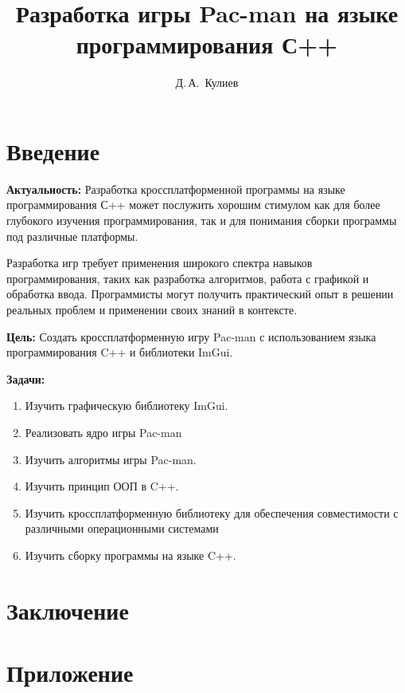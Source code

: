 \documentclass[14pt, oneside]{altsu-report}
\title{Разработка игры Pac-man на языке программирования С++}
\author{Д.\,А.~Кулиев}
\institute{Институт цифровых технологий, электроники и физики}
\date{\the\year}
\begin{document}
\maketitle

\setcounter{page}{2}
\makeabstract
\tableofcontents

\chapter*{Введение}

\textbf{Актуальность:}
Разработка кроссплатформенной программы на языке программирования С++ может послужить хорошим стимулом как для более глубокого изучения программирования, так и для понимания сборки программы под различные платформы.

Разработка игр требует применения широкого спектра навыков программирования, таких как разработка алгоритмов, работа с графикой и обработка ввода.
Программисты могут получить практический опыт в решении реальных проблем и применении своих знаний в контексте.

\textbf{Цель:}
Создать кроссплатформенную игру Pac-man с использованием языка программирования C++ и библиотеки ImGui.

\textbf{Задачи:}
\begin{enumerate}
	\item Изучить графическую библиотеку ImGui.
    \item Реализовать ядро игры Pac-man
	\item Изучить алгоритмы игры Pac-man.
	\item Изучить принцип ООП в C++.
    \item Изучить кроссплатформенную библиотеку для обеспечения совместимости с различными операционными системами
	\item Изучить сборку программы на языке C++.
\end{enumerate}


 


\chapter*{Заключение}

\newpage
{}
\printbibliography[title={Список использованной литературы}]

\appendix
\newpage
\chapter*{\raggedleft\label{appendix1}Приложение}

\begin{code}
	\label{code:main}
\end{code}
\end{document}
